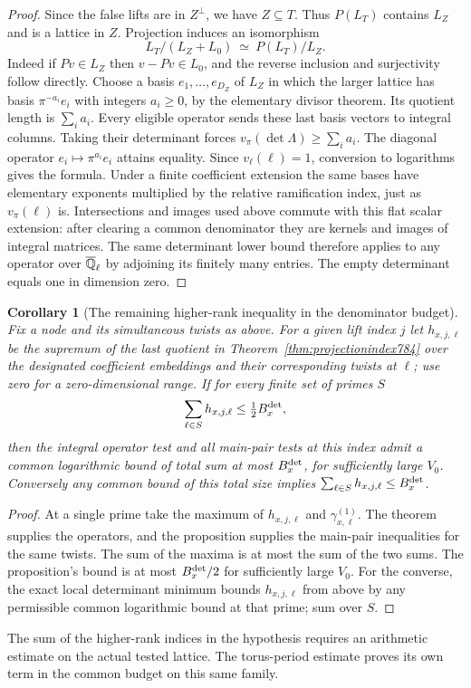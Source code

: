 \documentclass[a4paper,11pt]{article}
\newtheorem{corollary}[proposition]{Corollary}
\theoremstyle{definition}
\theoremstyle{remark}
\numberwithin{equation}{section}
\begin{document}
\begin{proof}
Since the false lifts are in \(Z^\perp\), we have
\(Z\subseteq T\). Thus \(P(L_T)\) contains \(L_Z\) and
is a lattice in \(Z\). Projection induces an isomorphism
\[
         L_T/(L_Z+L_0)\ \simeq\ P(L_T)/L_Z .
\]
Indeed if \(Pv\in L_Z\) then \(v-Pv\in L_0\), and the
reverse inclusion and surjectivity follow directly.
Choose a basis \(e_1,\ldots,e_{D_Z}\) of \(L_Z\) in
which the larger lattice has basis \(\pi^{-a_i}e_i\)
with integers \(a_i\ge0\), by the elementary divisor
theorem. Its quotient length is \(\sum_i a_i\).
Every eligible operator sends these last basis vectors
to integral columns. Taking their determinant forces
\(v_\pi(\det\Lambda)\ge\sum_i a_i\). The diagonal
operator \(e_i\mapsto\pi^{a_i}e_i\) attains equality.
Since \(v_\ell(\ell)=1\), conversion to logarithms gives
the formula. Under a finite coefficient extension the
same bases have elementary exponents multiplied by
the relative ramification index, just as \(v_\pi(\ell)\)
is. Intersections and images used above commute with
this flat scalar extension: after clearing a common
denominator they are kernels and images of integral
matrices. The same determinant lower bound therefore
applies to any operator over \(\overline{\mathbb Q}_\ell\)
by adjoining its finitely many entries. The empty
determinant equals one in dimension zero.
\end{proof}

\begin{corollary}[The remaining higher-rank inequality in the denominator budget]
\leavevmode\label{cor:remainingbudget784}
Fix a node and its simultaneous twists as above. For
a given lift index \(j\) let \(h_{x,j,\ell}\) be the
supremum of the last quotient in
Theorem~\ref{thm:projectionindex784} over the designated
coefficient embeddings and their corresponding twists
at \(\ell\); use zero for a zero-dimensional range.
If for every finite set of primes \(S\)
\[
                   \sum_{\ell\in S}h_{x,j,\ell}
                              \le \tfrac12 B_x^{\rm det},
\]
then the integral operator test and all main-pair tests
at this index admit a common logarithmic bound of total
sum at most \(B_x^{\rm det}\), for sufficiently large
\(V_0\). Conversely any common bound of this total
size implies \(\sum_{\ell\in S}h_{x,j,\ell}\le B_x^{\rm det}\).
\end{corollary}
\begin{proof}
At a single prime take the maximum of \(h_{x,j,\ell}\)
and \(\gamma^{(1)}_{x,\ell}\). The theorem supplies the
operators, and the proposition supplies the main-pair
inequalities for the same twists. The sum of the maxima
is at most the sum of the two sums. The proposition's
bound is at most \(B_x^{\rm det}/2\) for sufficiently
large \(V_0\). For the converse, the exact local
determinant minimum bounds \(h_{x,j,\ell}\) from above
by any permissible common logarithmic bound at that
prime; sum over \(S\).
\end{proof}
The sum of the higher-rank indices in the hypothesis
requires an arithmetic estimate on the actual tested
lattice. The torus-period estimate proves its own term
in the common budget on this same family.
\clearpage
\end{document}

